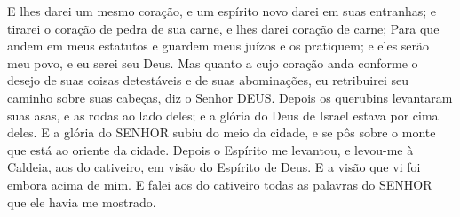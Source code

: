 {E lhes darei um mesmo coração, e um espírito novo darei em suas entranhas; e tirarei o coração de pedra de sua carne, e lhes darei coração de carne;
Para que andem em meus estatutos e guardem meus juízos e os pratiquem; e eles serão meu povo, e eu serei seu Deus.
Mas quanto a
{} cujo coração anda conforme o desejo de suas coisas detestáveis e de suas abominações, eu retribuirei seu caminho sobre suas cabeças, diz o Senhor DEUS.
Depois os querubins levantaram suas asas, e as rodas ao lado deles; e a glória do Deus de Israel estava por cima deles.
E a glória do SENHOR subiu do meio da cidade, e se pôs sobre o monte que está ao oriente da cidade.
Depois o Espírito me levantou, e levou-me à Caldeia, aos do cativeiro, em visão do Espírito de Deus. E a visão que vi foi embora acima de mim.
E falei aos do cativeiro todas as palavras do SENHOR que ele havia me mostrado.

}

